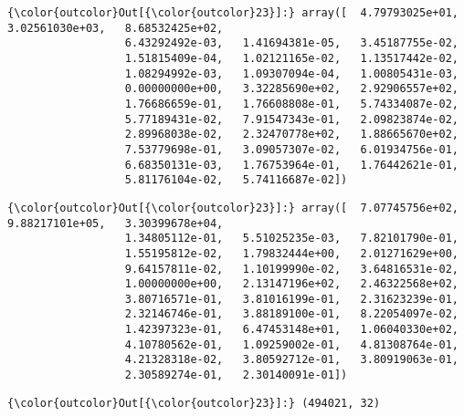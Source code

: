 \documentclass[11pt]{article}
\begin{document}
\begin{Verbatim}[commandchars=\\\{\}]
{\color{outcolor}Out[{\color{outcolor}23}]:} array([  4.79793025e+01,   3.02561030e+03,   8.68532425e+02,
                  6.43292492e-03,   1.41694381e-05,   3.45187755e-02,
                  1.51815409e-04,   1.02121165e-02,   1.13517442e-02,
                  1.08294992e-03,   1.09307094e-04,   1.00805431e-03,
                  0.00000000e+00,   3.32285690e+02,   2.92906557e+02,
                  1.76686659e-01,   1.76608808e-01,   5.74334087e-02,
                  5.77189431e-02,   7.91547343e-01,   2.09823874e-02,
                  2.89968038e-02,   2.32470778e+02,   1.88665670e+02,
                  7.53779698e-01,   3.09057307e-02,   6.01934756e-01,
                  6.68350131e-03,   1.76753964e-01,   1.76442621e-01,
                  5.81176104e-02,   5.74116687e-02])
\end{Verbatim}
            
\begin{Verbatim}[commandchars=\\\{\}]
{\color{outcolor}Out[{\color{outcolor}23}]:} array([  7.07745756e+02,   9.88217101e+05,   3.30399678e+04,
                  1.34805112e-01,   5.51025235e-03,   7.82101790e-01,
                  1.55195812e-02,   1.79832444e+00,   2.01271629e+00,
                  9.64157811e-02,   1.10199990e-02,   3.64816531e-02,
                  1.00000000e+00,   2.13147196e+02,   2.46322568e+02,
                  3.80716571e-01,   3.81016199e-01,   2.31623239e-01,
                  2.32146746e-01,   3.88189100e-01,   8.22054097e-02,
                  1.42397323e-01,   6.47453148e+01,   1.06040330e+02,
                  4.10780562e-01,   1.09259002e-01,   4.81308764e-01,
                  4.21328318e-02,   3.80592712e-01,   3.80919063e-01,
                  2.30589274e-01,   2.30140091e-01])
\end{Verbatim}
            
\begin{Verbatim}[commandchars=\\\{\}]
{\color{outcolor}Out[{\color{outcolor}23}]:} (494021, 32)
\end{Verbatim}
            
\end{document}

